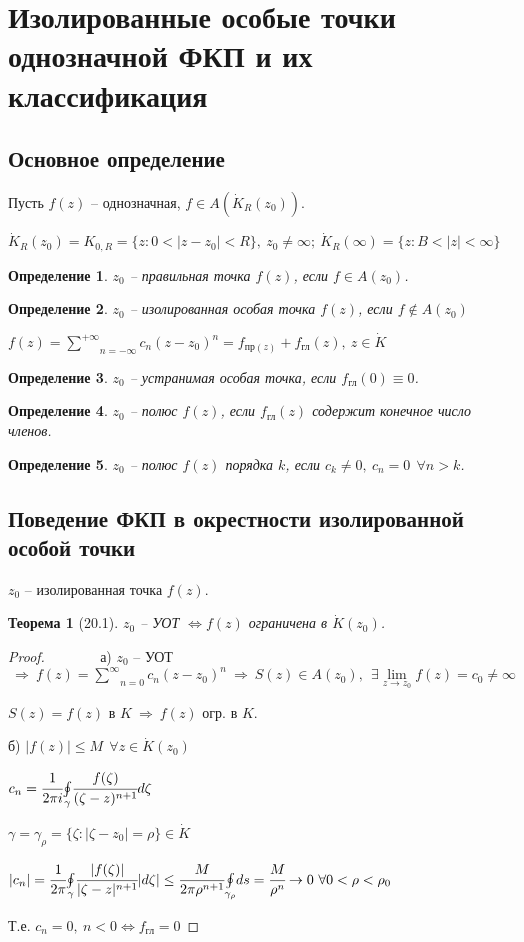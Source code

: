 \documentclass[draft]{article}
\newcommand{\forcenewline}{$\phantom{\mbox{newline}}$\newline}
\newcommand{\then}{\ \Rightarrow\ }
\newcommand{\moint}[1]{\underset{#1}{\oint}}
\newcommand{\msum}[2]{\underset{#1}{\overset{#2}{\sum}}}
\newcommand{\ssum}{\msum{n=0}{\infty}}
\newcommand{\lsum}{\msum{n=-\infty}{+\infty}}
\newcommand{\mlim}[1]{\underset{#1}{\lim}}
\newcommand{\LRA}{\Leftrightarrow}
\newcommand{\g}{\gamma}
\newcommand{\E}{\ \exists}
\newcommand{\F}{\ \forall}
\newcommand{\opr}[1]{\begin{opred}#1\end{opred}}
\newtheorem*{theor}{Теорема}
\newtheorem*{opred}{Определение}
\theoremstyle{remark}
\begin{document}
\newpage

\section{Изолированные особые точки однозначной ФКП и их классификация}

\subsection{Основное определение}

Пусть $f(z)$ -- однозначная, $f\in A(\dot{K}_R(z_0))$.

$\dot{K}_R(z_0)=K_{0,R}=\{z\colon0<|z-z_0|<R\},\ z_0\neq\infty;\ \dot{K}_R(\infty)=\{z\colon B<|z|<\infty\}$
\opr{$z_0$ -- правильная точка $f(z)$, если $f\in A(z_0)$.}
\opr{$z_0$ -- изолированная особая точка $f(z)$, если $f\not\in A(z_0)$}
$f(z)=\lsum c_n(z-z_0)^n=f_{\mbox{пр}(z)}+f_{\mbox{гл}}(z),\ z\in\dot{K}$
\opr{$z_0$ -- устранимая особая точка, если $f_{\mbox{гл}}(0)\equiv0$.}
\opr{$z_0$ -- полюс $f(z)$, если $f_{\mbox{гл}}(z)$ содержит конечное число членов.}
\opr{$z_0$ -- полюс $f(z)$ порядка $k$, если $c_k\neq0,\ c_n=0\ \F n>k$.}

\subsection{Поведение ФКП в окрестности изолированной особой точки}

$z_0$ -- изолированная точка $f(z)$.
\begin{theor}[20.1]
$z_0$ -- УОТ $\LRA f(z)$ ограничена в $\dot{K}(z_0)$.
\end{theor}
\begin{proof}
\forcenewline
а) $z_0$ -- УОТ $\then f(z)=\ssum c_n(z-z_0)^n\then S(z)\in A(z_0),\ \E \mlim{z\to z_0}f(z)=c_0\neq\infty$

$S(z)=f(z)$ в $K \then f(z)$ огр. в $K$.

б) $|f(z)|\leq M\ \F z\in\dot{K}(z_0)$

$c_n=\cfrac{1}{2\pi i}\moint{\gamma}\cfrac{f(\zeta)}{(\zeta-z)^{n+1}}d\zeta$

$\g=\g_\rho=\{\zeta\colon|\zeta-z_0|=\rho\}\in\dot{K}$

$|c_n|=\cfrac{1}{2\pi}\moint{\gamma}\cfrac{|f(\zeta)|}{|\zeta-z|^{n+1}}|d\zeta|\leq \cfrac{M}{2\pi\rho^{n+1}}\moint{\g_\rho}ds=\cfrac{M}{\rho^n}\to0 \F0<\rho<\rho_0$

Т.е. $c_n=0,\ n<0\LRA f_{\mbox{гл}}=0$
\end{proof}
\end{document}
